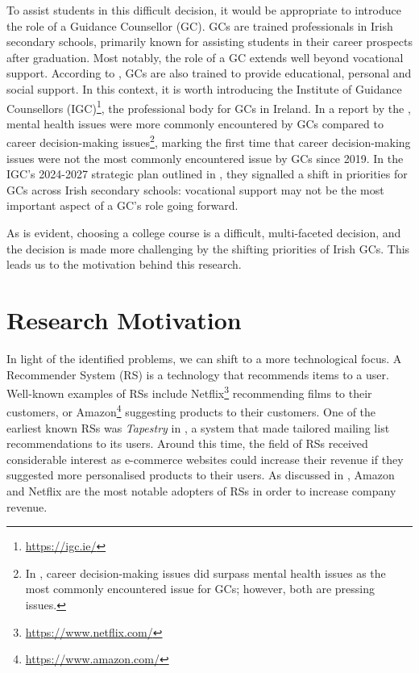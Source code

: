 To assist students in this difficult decision, it would be appropriate to introduce the role of 
a Guidance Counsellor (GC).
GCs are trained professionals in Irish secondary schools, primarily known for assisting students in their career prospects after graduation.
Most notably, the role of a GC extends well beyond vocational support.
According to \cite{igc2016core}, GCs are also trained to provide 
educational, personal and social support.
In this context, it is worth introducing the Institute of Guidance Counsellors (IGC)\footnote{\url{https://igc.ie/}}, the professional body for GCs in Ireland.
In a report by the \cite{igc2022survey}, mental health issues were more commonly encountered by GCs compared to
career decision-making issues\footnote{In \cite{igc2024survey}, career decision-making issues did surpass mental health issues as the most commonly encountered issue for GCs; however, both are pressing issues.}, marking the first time that career decision-making issues were not the most commonly encountered issue by GCs since 2019.
In the IGC's 2024-2027 strategic plan outlined in \cite{igc2024plan}, 
they signalled a shift in priorities for GCs across Irish secondary schools: vocational support may not be the most important aspect of a GC's role going forward.

As is evident, choosing a college course is a difficult, multi-faceted decision, and the decision is made more challenging 
by the shifting priorities of Irish GCs.
This leads us to the motivation behind this research.

\section{Research Motivation}
\label{sec:motivation}

In light of the identified problems, 
we can shift to a more technological focus. A Recommender System (RS) is a technology that recommends items to a user.
Well-known examples of RSs include Netflix\footnote{\url{https://www.netflix.com/}} recommending films to their customers, or Amazon\footnote{\url{https://www.amazon.com/}} suggesting products to their customers.
One of the earliest known RSs was \emph{Tapestry} in \cite{goldberg1992using},
a system that made tailored mailing list recommendations to its users. 
Around this time, the field of RSs received considerable interest as e-commerce websites could increase
their revenue if they suggested more personalised products to their users.
As discussed in \cite{schafer1999recommender}, Amazon and Netflix are the most notable adopters of RSs
in order to increase company revenue.

